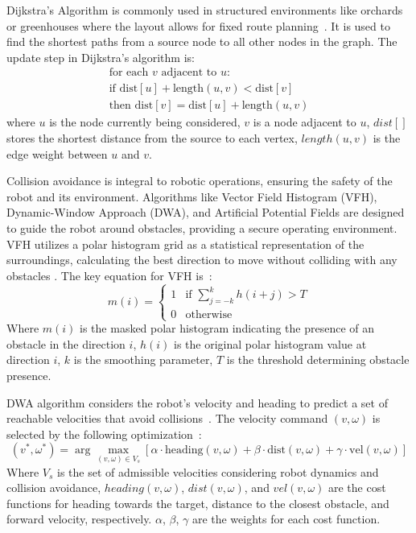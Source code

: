\documentclass{ieeeaccess}
\begin{document}
Dijkstra's Algorithm is commonly used in structured environments like orchards or greenhouses where the layout allows for fixed route planning~\cite{silwal2017design, dijkstra1959note}. It is used to find the shortest paths from a source node to all other nodes in the graph. The update step in Dijkstra's algorithm is:
\begin{equation}
\begin{aligned}
\text{for each } v \text{ adjacent to } u: \\
\text{if } \text{dist}[u] + \text{length}(u, v) < \text{dist}[v] \\
\text{then } \text{dist}[v] = \text{dist}[u] + \text{length}(u, v)
\end{aligned}
\label{eq:dijkstra}
\end{equation}
where $u$ is the node currently being considered, $v$ is a node adjacent to $u$, $dist[]$ stores the shortest distance from the source to each vertex, $length(u,v)$ is the edge weight between $u$ and $v$.

Collision avoidance is integral to robotic operations, ensuring the safety of the robot and its environment. Algorithms like Vector Field Histogram (VFH), Dynamic-Window Approach (DWA), and Artificial Potential Fields are designed to guide the robot around obstacles, providing a secure operating environment. 
VFH utilizes a polar histogram grid as a statistical representation of the surroundings, calculating the best direction to move without colliding with any obstacles \cite{silwal2017design}. The key equation for VFH is~\cite{borenstein1991vfh}:
\begin{equation}
m(i) = \begin{cases} 
1 & \text{if } \sum_{j=-k}^k h(i+j) > T \\
0 & \text{otherwise} 
\end{cases}
\label{eq:vfh}
\end{equation}
Where $m(i)$ is the masked polar histogram indicating the presence of an obstacle in the direction $i$,
$h(i)$ is the original polar histogram value at direction $i$, $k$ is the smoothing parameter, $T$ is the threshold determining obstacle presence.

DWA algorithm considers the robot's velocity and heading to predict a set of reachable velocities that avoid collisions~\cite{sepulveda2020robotic}.   The velocity command $(v,\omega)$ is selected by the following optimization~\cite{fox1997dynamic}:
\begin{equation}
(v^*, \omega^*) = \arg \max_{(v, \omega) \in V_s} [ \alpha \cdot \text{heading}(v, \omega) + \beta \cdot \text{dist}(v, \omega) + \gamma \cdot \text{vel}(v, \omega) ]
\label{eq:dwa}
\end{equation}
Where $V_s$ is the set of admissible velocities considering robot dynamics and collision avoidance, $heading(v, \omega)$, $dist(v, \omega)$, and $vel(v, \omega)$ are the cost functions for heading towards the target, distance to the closest obstacle, and forward velocity, respectively. $\alpha$, $\beta$, $\gamma$ are the weights for each cost function.
\end{document}
